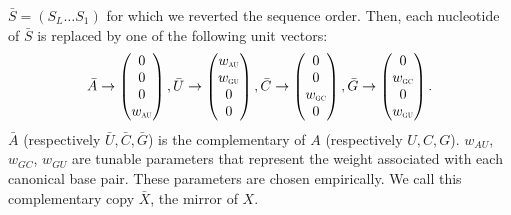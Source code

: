 \documentclass[a4paper,12pt]{article}
\begin{document}
\(\bar{S}=(S_L\dots S_1)\) for which we reverted the sequence order. Then, each
nucleotide of \(\bar{S}\) is replaced by one of the following unit vectors:
\begin{equation}
\begin{split}
\bar{A} \rightarrow \begin{pmatrix} 0\\ 0\\ 0\\ w_{\scalebox{0.5}{AU}}\\ \end{pmatrix},
\bar{U} \rightarrow \begin{pmatrix} w_{\scalebox{0.5}{AU}}\\ w_{\scalebox{0.5}{GU}}\\ 0\\ 0\\ \end{pmatrix},
\bar{C} \rightarrow \begin{pmatrix} 0\\ 0\\ w_{\scalebox{0.5}{GC}}\\ 0\\ \end{pmatrix},
\bar{G} \rightarrow \begin{pmatrix} 0\\ w_{\scalebox{0.5}{GC}}\\ 0\\ w_{\scalebox{0.5}{GU}}\\ \end{pmatrix}.
\end{split}
\end{equation}
\(\bar{A}\) (respectively \(\bar{U}, \bar{C}, \bar{G}\)) is the complementary of \(A\)
(respectively \(U, C, G\)). \(w_{AU}\), \(w_{GC}\), \(w_{GU}\) are tunable parameters
that represent the weight associated with each canonical base pair. These
parameters are chosen empirically. We call this complementary copy \(\bar{X}\),
the mirror of \(X\).
\end{document}
